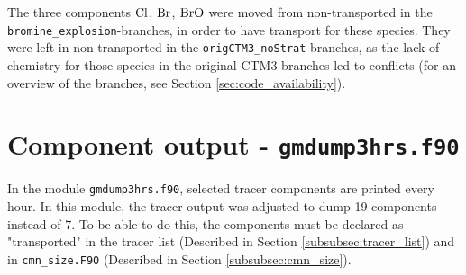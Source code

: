 The three components $\mathrm{Cl}$, $\mathrm{Br}$, $\mathrm{BrO}$ were moved from non-transported in the \texttt{bromine\_explosion}-branches, in order to have transport for these species. They were left in non-transported in the \texttt{origCTM3\_noStrat}-branches, as the lack of chemistry for those species in the original CTM3-branches led to conflicts (for an overview of the branches, see Section \ref{sec:code_availability}). 

\section{Component output - \texttt{gmdump3hrs.f90}}\label{subsubsec:gmdump}

In the module \texttt{gmdump3hrs.f90}, selected tracer components are printed every hour. In this module, the tracer output was adjusted to dump 19 components instead of 7. To be able to do this, the components must be declared as "transported" in the tracer list (Described in Section \ref{subsubsec:tracer_list}) and in \texttt{cmn\_size.F90} (Described in Section \ref{subsubsec:cmn_size}).
